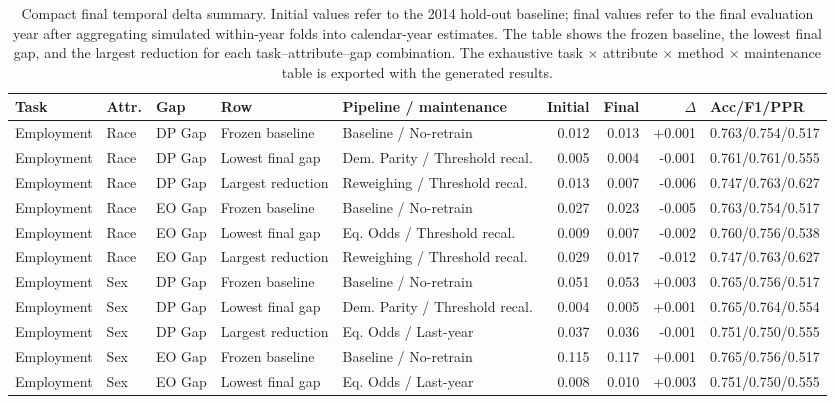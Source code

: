 \begin{table}[H]
\centering
\scriptsize
\setlength{\tabcolsep}{3pt}
\renewcommand{\arraystretch}{1.05}
\caption{Compact final temporal delta summary. Initial values refer to the 2014 hold-out baseline; final values refer to the final evaluation year after aggregating simulated within-year folds into calendar-year estimates. The table shows the frozen baseline, the lowest final gap, and the largest reduction for each task--attribute--gap combination. The exhaustive task $\times$ attribute $\times$ method $\times$ maintenance table is exported with the generated results.}
\label{tab:final_delta_summary}
\begin{tabular}{lll l p{} rrr l}
\toprule
Task & Attr. & Gap & Row & Pipeline / maintenance & Initial & Final & $\Delta$ & Acc/F1/PPR \\
\midrule
Employment & Race & DP Gap & Frozen baseline & Baseline / No-retrain & 0.012 & 0.013 & +0.001 & 0.763/0.754/0.517 \\
Employment & Race & DP Gap & Lowest final gap & Dem. Parity / Threshold recal. & 0.005 & 0.004 & -0.001 & 0.761/0.761/0.555 \\
Employment & Race & DP Gap & Largest reduction & Reweighing / Threshold recal. & 0.013 & 0.007 & -0.006 & 0.747/0.763/0.627 \\
Employment & Race & EO Gap & Frozen baseline & Baseline / No-retrain & 0.027 & 0.023 & -0.005 & 0.763/0.754/0.517 \\
Employment & Race & EO Gap & Lowest final gap & Eq. Odds / Threshold recal. & 0.009 & 0.007 & -0.002 & 0.760/0.756/0.538 \\
Employment & Race & EO Gap & Largest reduction & Reweighing / Threshold recal. & 0.029 & 0.017 & -0.012 & 0.747/0.763/0.627 \\
Employment & Sex & DP Gap & Frozen baseline & Baseline / No-retrain & 0.051 & 0.053 & +0.003 & 0.765/0.756/0.517 \\
Employment & Sex & DP Gap & Lowest final gap & Dem. Parity / Threshold recal. & 0.004 & 0.005 & +0.001 & 0.765/0.764/0.554 \\
Employment & Sex & DP Gap & Largest reduction & Eq. Odds / Last-year & 0.037 & 0.036 & -0.001 & 0.751/0.750/0.555 \\
Employment & Sex & EO Gap & Frozen baseline & Baseline / No-retrain & 0.115 & 0.117 & +0.001 & 0.765/0.756/0.517 \\
Employment & Sex & EO Gap & Lowest final gap & Eq. Odds / Last-year & 0.008 & 0.010 & +0.003 & 0.751/0.750/0.555 \\

\end{tabular}
\end{table}
